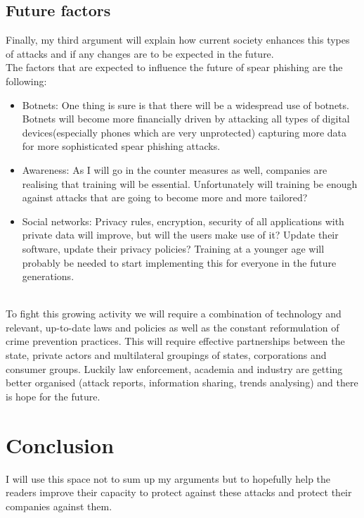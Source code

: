 \documentclass[12pt]{article} %
\begin{document}
\subsection{Future factors}
Finally, my third argument will explain how current society enhances this types of attacks and if any changes are to be expected in the future.\\
The factors that are expected to influence the future of spear phishing are the following:
\begin{itemize}
\item Botnets: One thing is sure is that there will be a widespread use of botnets. Botnets will become more financially driven by attacking all types of digital devices(especially phones which are very unprotected) capturing more data for more sophisticated spear phishing attacks.\cite{future trends,social engineering}
\item Awareness: As I will go in the counter measures as well, companies are realising that training will be essential. Unfortunately will training be enough against attacks that are going to become more and more tailored?
\item Social networks: Privacy rules, encryption, security of all applications with private data will improve, but will the users make use of it? Update their software, update their privacy policies? Training at a younger age will probably be needed to start implementing this for everyone in the future generations.
\end{itemize}
\cite{future trends}\\
To fight this growing activity we will require a combination of technology and relevant, up-to-date  laws  and  policies  as  well  as  the  constant  reformulation  of  crime  prevention  practices. This will require effective partnerships between the state, private actors and multilateral groupings  of  states,  corporations  and  consumer  groups.
Luckily law enforcement, academia and industry are getting better organised (attack reports, information sharing, trends analysing) and there is hope for the future.\cite{state of phishing, future trends}

\section{Conclusion}
I will use this space not to sum up my arguments but to hopefully help the readers improve their capacity to protect against these attacks and protect their companies against them.
\end{document}
